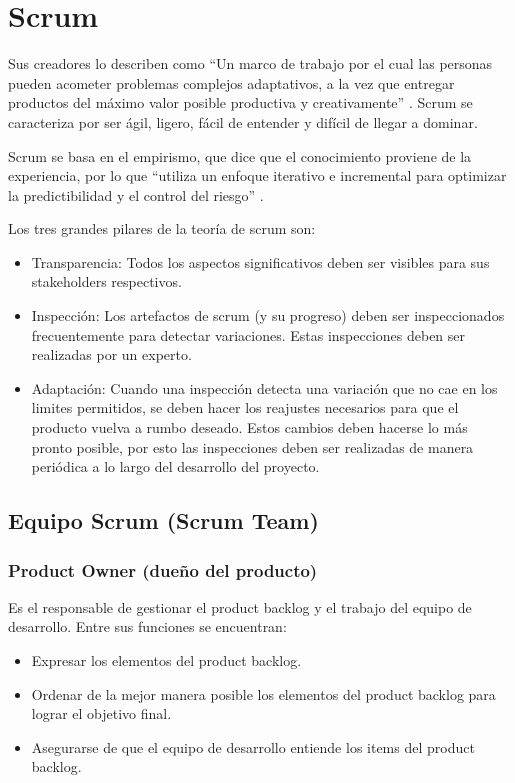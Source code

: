 \section{Scrum}

Sus creadores lo describen como “Un marco de trabajo por el cual las personas pueden acometer problemas complejos 
adaptativos, a la vez que entregar productos del máximo valor posible productiva y creativamente” \cite{scrum_guide}. Scrum se caracteriza por ser ágil, ligero, fácil de entender y difícil de llegar a dominar.

Scrum se basa en el empirismo, que dice que el conocimiento proviene de la experiencia, por lo que ``utiliza un enfoque iterativo e incremental para optimizar la predictibilidad y el control del riesgo'' \cite{scrum_guide}.

Los tres grandes pilares de la teoría de scrum son:

\begin{itemize}
  \item Transparencia: Todos los aspectos significativos deben ser visibles para sus stakeholders respectivos.

  \item Inspección: Los artefactos de scrum (y su progreso) deben ser inspeccionados frecuentemente para detectar variaciones. Estas inspecciones deben ser realizadas por un experto.

  \item Adaptación: Cuando una inspección detecta una variación que no cae en los limites permitidos, se deben hacer los reajustes necesarios para que el producto vuelva a rumbo deseado. Estos cambios deben hacerse lo más pronto posible, por esto las inspecciones deben ser realizadas de manera periódica a lo largo del desarrollo del proyecto.
\end{itemize}

\subsection{Equipo Scrum (Scrum Team)}

\subsubsection{Product Owner (dueño del producto)}

Es el responsable de gestionar el product backlog y el trabajo del equipo de desarrollo. Entre sus funciones se encuentran:
\begin{itemize}
		  \item Expresar los elementos del product backlog.
		  \item Ordenar de la mejor manera posible los elementos del product backlog para lograr el objetivo final.
		  \item Asegurarse de que el equipo de desarrollo entiende los items del product backlog.
		\end{itemize}
		
